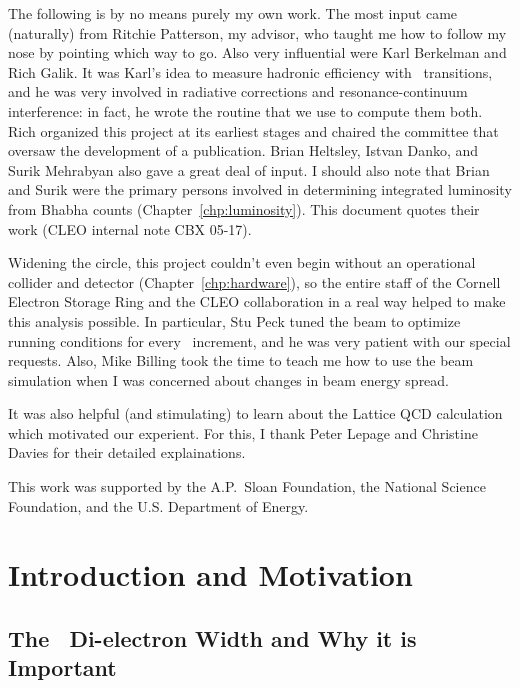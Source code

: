 \documentclass{cornell}
\begin{document}
\begin{acknowledgements}
  The following is by no means purely my own work.  The most input
  came (naturally) from Ritchie Patterson, my advisor, who taught me
  how to follow my nose by pointing which way to go.  Also very
  influential were Karl Berkelman and Rich Galik.  It was Karl's idea
  to measure hadronic efficiency with \twotoone\ transitions, and he
  was very involved in radiative corrections and resonance-continuum
  interference: in fact, he wrote the routine that we use to compute
  them both.  Rich organized this project at its earliest stages and
  chaired the committee that oversaw the development of a publication.
  Brian Heltsley, Istvan Danko, and Surik Mehrabyan also gave a great
  deal of input.  I should also note that Brian and Surik were the
  primary persons involved in determining integrated luminosity from
  Bhabha counts (Chapter~\ref{chp:luminosity}).  This document quotes
  their work (CLEO internal note CBX 05-17).

  Widening the circle, this project couldn't even begin without an
  operational collider and detector (Chapter~\ref{chp:hardware}), so
  the entire staff of the Cornell Electron Storage Ring and the CLEO
  collaboration in a real way helped to make this analysis possible.
  In particular, Stu Peck tuned the beam to optimize running
  conditions for every \ecm\ increment, and he was very patient with
  our special requests.  Also, Mike Billing took the time to teach me
  how to use the beam simulation when I was concerned about changes in
  beam energy spread.

  It was also helpful (and stimulating) to learn about the Lattice QCD
  calculation which motivated our experient.  For this, I thank Peter
  Lepage and Christine Davies for their detailed explainations.

  This work was supported by the A.P.~Sloan Foundation, the National
  Science Foundation, and the U.S. Department of Energy.
\end{acknowledgements}
\contentspage
\tablelistpage
\figurelistpage

\normalspacing
\setcounter{page}{1}
\pagestyle{cornellc}

\chapter{Introduction and Motivation}
\label{chp:introduction}

\section{The \boldmath \ups\ Di-electron Width and Why it is Important}
\end{document}

